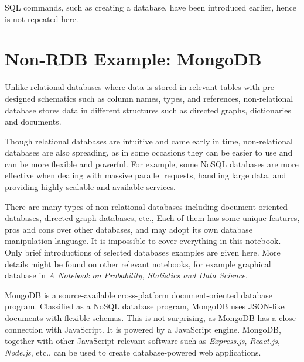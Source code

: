 SQL commands, such as creating a database, have been introduced earlier, hence is not repeated here.

\section{Non-RDB Example: MongoDB}

Unlike relational databases where data is stored in relevant tables with pre-designed schematics such as column names, types, and references, non-relational database stores data in different structures such as directed graphs, dictionaries and documents.

Though relational databases are intuitive and came early in time, non-relational databases are also spreading, as in some occasions they can be easier to use and can be more flexible and powerful. For example, some NoSQL databases are more effective when dealing with massive parallel requests, handling large data, and providing highly scalable and available services.

There are many types of non-relational databases including document-oriented databases, directed graph databases, etc., Each of them has some unique features, pros and cons over other databases, and may adopt its own database manipulation language. It is impossible to cover everything in this notebook. Only brief introductions of selected databases examples are given here. More details might be found on other relevant notebooks, for example graphical database in \textit{A Notebook on Probability, Statistics and Data Science}.

MongoDB is a source-available cross-platform document-oriented database program. Classified as a NoSQL database program, MongoDB uses JSON-like documents with flexible schemas. This is not surprising, as MongoDB has a close connection with JavaScript. It is powered by a JavaScript engine. MongoDB, together with other JavaScript-relevant software such as \textit{Express.js}, \textit{React.js}, \textit{Node.js}, etc., can be used to create database-powered web applications.

